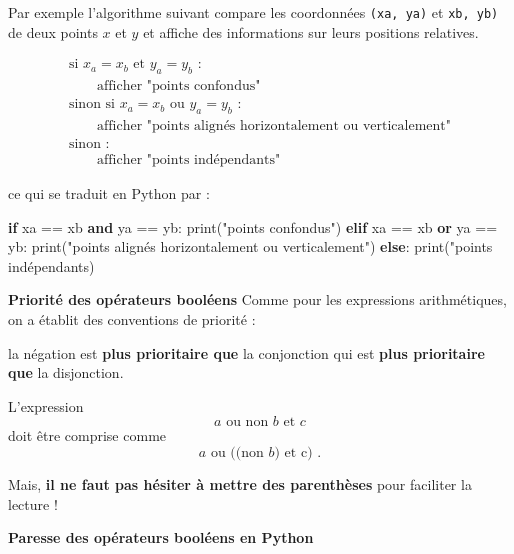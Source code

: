 \documentclass[a4paper,17pt]{extarticle}
\newenvironment{Shaded}{}{}
\newcommand{\KeywordTok}[1]{\textcolor[rgb]{0.00,0.44,0.13}{\textbf{{#1}}}}
\newcommand{\StringTok}[1]{\textcolor[rgb]{0.25,0.44,0.63}{{#1}}}
\newcommand{\NormalTok}[1]{{#1}}
\newcommand{\ControlFlowTok}[1]{\textcolor[rgb]{0.00,0.44,0.13}{\textbf{{#1}}}}
\newcommand{\OperatorTok}[1]{\textcolor[rgb]{0.40,0.40,0.40}{{#1}}}
\newcommand{\BuiltInTok}[1]{{#1}}
\begin{document}
\begin{exemple}
    Par exemple l'algorithme suivant compare les coordonnées
\texttt{(xa,\ ya)} et \texttt{xb,\ yb)} de deux points \(x\) et \(y\) et
affiche des informations sur leurs positions relatives.

\[
\begin{array}{ll}
\text{si $x_a = x_b$ et $y_a = y_b$ :} \\
\qquad\text{afficher "points confondus"} \\
\text{sinon si $x_a = x_b$ ou $y_a = y_b$ :} \\
\qquad \text{afficher "points alignés horizontalement ou verticalement"}\\
\text{sinon :}\\
\qquad\text{afficher "points indépendants"}
\end{array}
\]

ce qui se traduit en Python par :

\begin{Shaded}
\begin{Highlighting}[]
\ControlFlowTok{if}\NormalTok{ xa }\OperatorTok{==}\NormalTok{ xb }\KeywordTok{and}\NormalTok{ ya }\OperatorTok{==}\NormalTok{ yb:}
    \BuiltInTok{print}\NormalTok{(}\StringTok{"points confondus"}\NormalTok{)}
\ControlFlowTok{elif}\NormalTok{ xa }\OperatorTok{==}\NormalTok{ xb }\KeywordTok{or}\NormalTok{ ya }\OperatorTok{==}\NormalTok{ yb:}
    \BuiltInTok{print}\NormalTok{(}\StringTok{"points alignés horizontalement ou verticalement"}\NormalTok{)}
\ControlFlowTok{else}\NormalTok{:}
    \BuiltInTok{print}\NormalTok{(}\StringTok{"points indépendants)}
\end{Highlighting}
\end{Shaded}

        \end{exemple}\begin{remarque}
    \textbf{Priorité des opérateurs booléens} Comme pour les expressions
arithmétiques, on a établit des conventions de priorité :

la négation est \textbf{plus prioritaire que} la conjonction qui est
\textbf{plus prioritaire que} la disjonction.

L'expression \[\text{$a$ ou non $b$ et $c$}\] doit être comprise comme
\[\text{$a$ ou $\big(($non $b$) et c$\big)$ .}\]

Mais, \textbf{il ne faut pas hésiter à mettre des parenthèses} pour
faciliter la lecture !

        \end{remarque}\begin{remarque}
    \textbf{Paresse des opérateurs booléens en Python}


\end{remarque}
\end{document}
